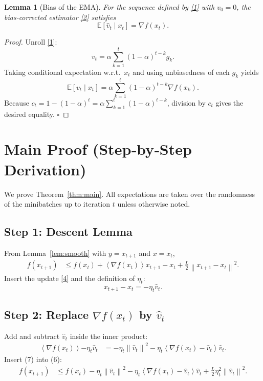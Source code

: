 \documentclass{article}
\newtheorem{lemma}{Lemma}
\newcommand{\E}{\mathbb{E}}
\newcommand{\norm}[1]{\left\|#1\right\|}
\newcommand{\inner}[1]{\left\langle #1 \right\rangle}
\newcommand{\grad}{\nabla}
\begin{document}
\begin{lemma}[Bias of the EMA]\label{lem:bias}
For the sequence defined by \eqref{1} with $v_{0}=0$, the bias‑corrected estimator \eqref{2} satisfies
\[
\E[\hat v_{t}\mid x_{t}] = \grad f(x_{t}) .
\]
\end{lemma}
\begin{proof}
Unroll \eqref{1}:
\[
v_{t}= \alpha\sum_{k=1}^{t}(1-\alpha)^{t-k}g_{k}.
\]
Taking conditional expectation w.r.t.\ $x_{t}$ and using unbiasedness of each $g_{k}$ yields
\[
\E[v_{t}\mid x_{t}]=\alpha\sum_{k=1}^{t}(1-\alpha)^{t-k}\grad f(x_{k}).
\]
Because $c_{t}=1-(1-\alpha)^{t}= \alpha\sum_{k=1}^{t}(1-\alpha)^{t-k}$, division by $c_{t}$ gives the desired equality. \hfill $\square$
\end{proof}

\section*{Main Proof (Step‑by‑Step Derivation)}
We prove Theorem~\ref{thm:main}.  All expectations are taken over the randomness of the minibatches up to iteration $t$ unless otherwise noted.

\subsection*{Step 1: Descent Lemma}
From Lemma~\ref{lem:smooth} with $y=x_{t+1}$ and $x=x_{t}$,
\begin{align}
f(x_{t+1})
&\le f(x_{t}) + \inner{\grad f(x_{t})}{x_{t+1}-x_{t}} + \frac{L}{2}\norm{x_{t+1}-x_{t}}^{2}. \tag{6}
\end{align}
Insert the update \eqref{4} and the definition of $\eta_{t}$:
\[
x_{t+1}-x_{t}= -\eta_{t}\hat v_{t}.
\]

\subsection*{Step 2: Replace $\grad f(x_{t})$ by $\hat v_{t}$}
Add and subtract $\hat v_{t}$ inside the inner product:
\begin{align}
\inner{\grad f(x_{t})}{-\eta_{t}\hat v_{t}}
&= -\eta_{t}\norm{\hat v_{t}}^{2}
   -\eta_{t}\inner{\grad f(x_{t})-\hat v_{t}}{\hat v_{t}}. \tag{7}
\end{align}
Insert (7) into (6):
\begin{align}
f(x_{t+1})
&\le f(x_{t}) -\eta_{t}\norm{\hat v_{t}}^{2}
     -\eta_{t}\inner{\grad f(x_{t})-\hat v_{t}}{\hat v_{t}}
     +\frac{L}{2}\eta_{t}^{2}\norm{\hat v_{t}}^{2}. \tag{8}
\end{align}
\end{document}
